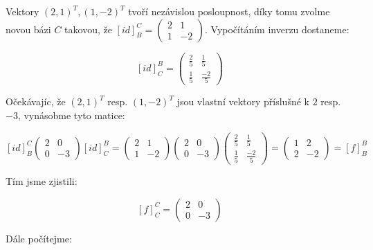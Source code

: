 \documentclass[12pt]{article}
\begin{document}
Vektory $(2,1)^T, (1,-2)^T$ tvoří nezávislou posloupnost, díky tomu zvolme novou bázi $C$ takovou, že $[id]^C_B = \left(\begin{array}{cc}
  2 & 1 \\ 1 & -2
\end{array}\right)$. Vypočítáním inverzu dostaneme:

\[
  [id]^B_C = \left(\begin{array}{cc}
    \frac{2}{5} & \frac{1}{5} \\[.5em] \frac{1}{5} & \frac{-2}{5}
  \end{array}\right)
\]

Očekávajíc, že $(2,1)^T$ resp. $(1,-2)^T$ jsou vlastní vektory příslušné k $2$ resp. $-3$, vynásobme
tyto matice:

\[
  [id]^C_B \left(\begin{array}{cc}
    2 & 0 \\ 0 & -3
  \end{array}\right) [id]^B_C = \left(\begin{array}{cc}
    2 & 1 \\ 1 & -2
  \end{array}\right)\left(\begin{array}{cc}
    2 & 0 \\ 0 & -3
  \end{array}\right) \left(\begin{array}{cc}
    \frac{2}{5} & \frac{1}{5} \\[.5em] \frac{1}{5} & \frac{-2}{5}
  \end{array}\right) = \left(\begin{array}{cc}
    1 & 2 \\
    2 & -2
  \end{array}\right) = [f]^B_B
\]

Tím jsme zjistili:

\[
  [f]^C_C = \left(\begin{array}{cc}
    2 & 0 \\ 0 & -3
  \end{array}\right)
\]

Dále počítejme:
\end{document}
